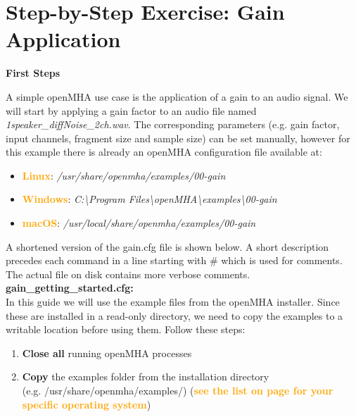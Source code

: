 \documentclass[11pt,a4paper,twoside]{article}
\newcommand{\+}{\discretionary{\mbox{\scriptsize$\hookleftarrow$}}{}{}}
\begin{document}
{{

\section{Step-by-Step Exercise: Gain Application}

\textbf{First Steps}
\label{sec:first_steps}

A simple openMHA use case is the application of a gain to an audio signal.
We will start by applying a gain factor to an audio file named {{\ttfamily \textit{1speaker\_diffNoise\_2ch.wav}}}. The corresponding parameters (e.g. gain factor, input channels, fragment size and sample size) can be set manually, however for this example there is already an openMHA configuration file available at: 
\begin{itemize}\label{list:examples-location}
\item \textcolor{orange}{\textbf{Linux}}: \textit{/usr/share/openmha/examples/00-gain} 
\item \textcolor{orange}{\textbf{Windows}}: \textit{C:\textbackslash Program Files\textbackslash openMHA\textbackslash examples\textbackslash 00-gain}
\item \textcolor{orange}{\textbf{macOS}}: \textit{/usr/local/share/openmha/examples/00-gain} 
\end{itemize}

A shortened version of the gain.cfg file is shown below.
A short description precedes each command
in a line starting with \# which is used for comments.
The actual file on disk contains more verbose comments.
\\

\textbf{gain\_getting\_started.cfg:} \\



\newpage 
In this guide we will use the example files from the openMHA installer.
Since these are installed in a read-only directory, we need to copy
the examples to a writable location before using them. 
Follow these steps:


\begin{enumerate}
    \item \textbf{Close all} running openMHA processes
    
    \item \textbf{Copy} the examples folder from the installation directory
      \\
      (e.g. /usr/share/openmha/examples/)
      (\textcolor{orange}
        {\textbf{see the list on page \pageref{list:examples-location}
            for your specific operating system}})
   

\end{enumerate}}}
\end{document}

